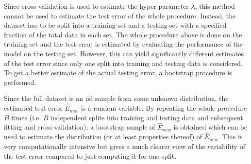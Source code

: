\documentclass[../../project.tex]{subfiles}
\begin{document}
	Since cross-validation is used to estimate the hyper-parameter $\lambda$, this method cannot be used to estimate the test error of the whole procedure. Instead, the dataset has to be split into a training set and a testing set with a specified fraction of the total data in each set. The whole procedure above is done on the training set and the test error is estimated by evaluating the performance of the model on the testing set. However, this can yield significantly different estimates of the test error since only one split into training and testing data is considered. To get a better estimate of the actual testing error, a bootstrap procedure is performed.
	
	Since the full dataset is an iid sample from some unknown distribution, the estimated test error $\hat E_{new}$ is a random variable. By repeating the whole procedure $B$ times (i.e. $B$ independent splits into training and testing data and subsequent fitting and cross-validation), a bootstrap sample of $\hat E_{new}$ is obtained which can be used to estimate the distribution (or at least properties thereof) of $\hat E_{new}$. This is very computationally intensive but gives a much clearer view of the variability of the test error compared to just computing it for one split.
\end{document}
